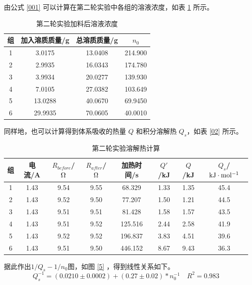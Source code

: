 \documentclass[cn,hazy,pku,12pt,normal,math=newtx,cite=super]{elegantnote}
\begin{document}
由公式 \ref{001} 可以计算在第二轮实验中各组的溶液浓度，如表 \ref{03} 所示。

\begin{table}[h]
    \centering
    \caption{第二轮实验加料后溶液浓度}
    \label{03}
    \begin{tabular}{cccc}
    \hline
    组&加入溶质质量/g & 总溶质质量/g & $n_0$    \\ \hline
    1&3.0175   & 13.0408 & 214.900  \\
    2&2.9935   & 16.0343 & 174.780  \\
    3&3.9934   & 20.0277 & 139.930 \\
    4&7.0105   & 27.0382 & 103.649 \\
    5&13.0288  & 40.0670  & 69.9450   \\
    6&29.9935  & 70.0605 & 40.0010   \\ \hline
    \end{tabular}
\end{table}

同样地，也可以计算得到体系吸收的热量 $Q$ 和积分溶解热 $Q_s$，如表 \ref{02} 所示。

\begin{table}[h]
    \centering
    \caption{第二轮实验溶解热计算}
    \label{04}
    \begin{tabular}{cccccccc}
    \hline
    组&电流/A & $R_{before}$/$\rm \Omega$ & $R_{after}$/$\rm \Omega$& 加热时间/s & $Q'$/kJ & $Q$/kJ& $Q_s$/$\rm kJ \cdot mol^{-1}$ \\ \hline
    1&1.43 & 9.54 & 9.55 & 68.329  & 1.33 & 1.35& 45.4 \\
    2&1.43 & 9.52 & 9.50  & 77.207  & 1.50 & 1.21& 44.5 \\
    3&1.43 & 9.51 & 9.51 & 81.428  & 1.58 & 1.57& 43.5 \\
    4&1.43 & 9.51 & 9.52 & 125.516 & 2.44 & 2.58& 41.9 \\
    5&1.43 & 9.52 & 9.52 & 196.837 & 3.83 & 4.51& 39.6 \\
    6&1.43 & 9.51 & 9.50  & 446.152 & 8.67 & 9.43& 36.3 \\ \hline
    \end{tabular}
\end{table}

据此作出$1/Q_s-1/n_0$图，如图 \ref{5} ，得到线性关系如下。
\begin{equation}\label{-2}
Q_s^{-1} = (0.0210 \pm 0.0002) + (0.27 \pm 0.02) * n_0^{-1} \quad R^2=0.983
\end{equation}
\end{document}
